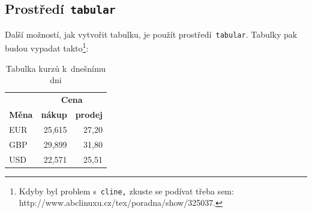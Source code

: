 \documentclass[a4paper, 11pt] {article}
\begin{document}
\subsection{Prostředí\texttt{ tabular}}
Další možností, jak vytvořit tabulku, je použít prostředí\texttt{ tabular}. Tabulky pak budou vypadat takto\footnote{Kdyby byl problem s\texttt{ cline,} zkuste se podívat třeba sem: http://www.abclinuxu.cz/tex/poradna/show/325037.}:
\bigskip
\begin{table}[h]\centering
\begin{tabular}{|l|r|r|}
\hline
                                    & \multicolumn{2}{c|}{\textbf{Cena}} \\ \cline{2-3} 
\multicolumn{1}{|l|}{\textbf{Měna}} & \textbf{nákup}  & \textbf{prodej}  \\ \hline
EUR                                 & 25,615          & 27,20            \\
GBP                                 & 29,899          & 31,80            \\
USD                                 & 22,571          & 25,51            \\ \hline
\end{tabular}
\caption{Tabulka kurzů k~dnešnímu dni}
\label{table1}
\end{table}\bigskip
\end{document}
